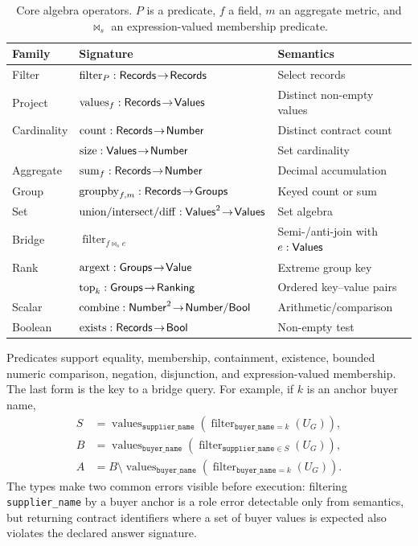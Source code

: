 \begin{table}[t]
  \caption{Core algebra operators.  $P$ is a predicate, $f$ a field, $m$ an aggregate metric,
  and $\bowtie_s$ an expression-valued membership predicate.}
  \label{tab:operators}
  \centering
  \small
  \begin{tabular}{lll}
    \toprule
    Family & Signature & Semantics \\
    \midrule
    Filter & $\operatorname{filter}_{P}:\mathsf{Records}\!\to\!\mathsf{Records}$ & Select records \\
    Project & $\operatorname{values}_{f}:\mathsf{Records}\!\to\!\mathsf{Values}$ & Distinct non-empty values \\
    Cardinality & $\operatorname{count}:\mathsf{Records}\!\to\!\mathsf{Number}$ & Distinct contract count \\
                & $\operatorname{size}:\mathsf{Values}\!\to\!\mathsf{Number}$ & Set cardinality \\
    Aggregate & $\operatorname{sum}_{f}:\mathsf{Records}\!\to\!\mathsf{Number}$ & Decimal accumulation \\
    Group & $\operatorname{groupby}_{f,m}:\mathsf{Records}\!\to\!\mathsf{Groups}$ & Keyed count or sum \\
    Set & $\operatorname{union/intersect/diff}:\mathsf{Values}^2\!\to\!\mathsf{Values}$ & Set algebra \\
    Bridge & $\operatorname{filter}_{f\bowtie_s e}$ & Semi-/anti-join with $e:\mathsf{Values}$ \\
    Rank & $\operatorname{argext}:\mathsf{Groups}\!\to\!\mathsf{Value}$ & Extreme group key \\
         & $\operatorname{top}_k:\mathsf{Groups}\!\to\!\mathsf{Ranking}$ & Ordered key--value pairs \\
    Scalar & $\operatorname{combine}:\mathsf{Number}^2\!\to\!\mathsf{Number}/\mathsf{Bool}$ & Arithmetic/comparison \\
    Boolean & $\operatorname{exists}:\mathsf{Records}\!\to\!\mathsf{Bool}$ & Non-empty test \\
    \bottomrule
  \end{tabular}
\end{table}

Predicates support equality, membership, containment, existence, bounded numeric comparison,
negation, disjunction, and expression-valued membership.  The last form is the key to a bridge
query.  For example, if $k$ is an anchor buyer name,
\begin{align}
 S &= \operatorname{values}_{\texttt{supplier\_name}}
      (\operatorname{filter}_{\texttt{buyer\_name}=k}(U_G)),\\
 B &= \operatorname{values}_{\texttt{buyer\_name}}
      (\operatorname{filter}_{\texttt{supplier\_name}\in S}(U_G)),\\
 A &= B\setminus
      \operatorname{values}_{\texttt{buyer\_name}}
      (\operatorname{filter}_{\texttt{buyer\_name}=k}(U_G)).
 \label{eq:bridge-example}
\end{align}
The types make two common errors visible before execution: filtering
\texttt{supplier\_name} by a buyer anchor is a role error detectable only from semantics, but
returning contract identifiers where a set of buyer values is expected also violates the
declared answer signature.


